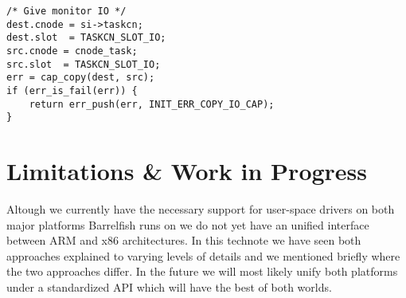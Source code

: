 \documentclass[a4paper,11pt,twoside]{report}
\begin{document}
\begin{lstlisting}[caption={Copy of the I/O capability from
    \varname{src} to \varname{dest}.}, label={lst:slotio}]
/* Give monitor IO */
dest.cnode = si->taskcn;
dest.slot  = TASKCN_SLOT_IO;
src.cnode = cnode_task;
src.slot  = TASKCN_SLOT_IO;
err = cap_copy(dest, src);
if (err_is_fail(err)) {
    return err_push(err, INIT_ERR_COPY_IO_CAP);
}
\end{lstlisting}

\section{Limitations \& Work in Progress}

Altough we currently have the necessary support for user-space drivers
on both major platforms Barrelfish runs on we do not yet have an
unified interface between ARM and x86 architectures. In this technote
we have seen both approaches explained to varying levels of details and
we mentioned briefly where the two approaches differ. In the future we will
most likely unify both platforms under a standardized API which will have
the best of both worlds.



\end{document}
